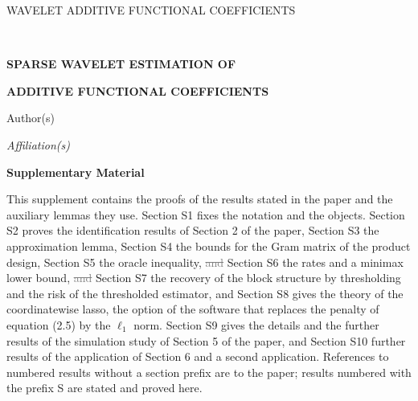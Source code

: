 \documentclass[10pt]{book}
\theoremstyle{definition}
\begin{document}
\renewcommand{\baselinestretch}{2}


{\hfill {\footnotesize\rm WAVELET ADDITIVE FUNCTIONAL COEFFICIENTS} \hfill}

\renewcommand{\thefootnote}{}
$\ $\par \fontsize{12}{14pt plus.8pt minus .6pt}\selectfont


\centerline{\large\bf SPARSE WAVELET ESTIMATION OF}
\vspace{2pt}
\centerline{\large\bf ADDITIVE FUNCTIONAL COEFFICIENTS}
\vspace{.25cm}
\centerline{Author(s)}
\vspace{.4cm}
\centerline{\it Affiliation(s)}
\vspace{.55cm}
\centerline{\bf Supplementary Material}
\vspace{.55cm}
\fontsize{9}{11.5pt plus.8pt minus .6pt}\selectfont
\noindent
This supplement contains the proofs of the results stated in the paper and
the auxiliary lemmas they use. Section S1 fixes the notation and the objects.
Section S2 proves the identification results of Section 2 of the paper,
Section S3 the approximation lemma, Section S4 the bounds for the Gram matrix
of the product design, Section S5 the oracle inequality, \textcolor{gray}{\sout{and}} Section S6 the
rates \textcolor{colR1}{and a minimax lower bound}\textcolor{colR1}{, \textcolor{gray}{\sout{and}} Section S7 the recovery of the block structure by
thresholding} \textcolor{colR1}{and the risk of the thresholded estimator, and
Section S8 gives the theory of the coordinatewise lasso, the option of the
software that replaces the penalty of equation (2.5) by the $\ell_1$ norm}\textcolor{colR1}{.
Section S9 gives the details and the further results of the simulation study
of Section 5 of the paper, and Section S10 further results of the application
of Section 6 and a second application}. References to numbered results without a section prefix are to the
paper; results numbered with the prefix S are stated and proved here.
\par

\setcounter{section}{0}
\setcounter{equation}{0}
\def\theequation{S\arabic{section}.\arabic{equation}}
\def\thesection{S\arabic{section}}
\end{document}
